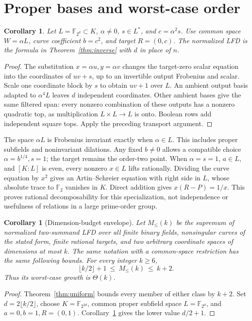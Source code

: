 \documentclass[11pt]{article}
\newtheorem{corollary}[theorem]{Corollary}
\theoremstyle{remark}\newtheorem{remark}[theorem]{Remark}
\newcommand{\F}{\mathbb F}
\begin{document}
\section{Proper bases and worst-case order}
\begin{corollary}\label{cor:scaled}
Let $L=\F_{2^d}\subset K$, $\alpha\ne0$, $s\in L^*$, and
$c=\alpha^2s$. Use common space $W=\alpha L$, curve coefficient $b=c^2$,
and target $R=(0,c)$. The normalized LFD is the formula in
Theorem~\ref{thm:inverse} with $d$ in place of $n$.
\end{corollary}
\begin{proof}
The substitution $x=\alpha u,y=\alpha v$ changes the target-zero scalar
equation into the coordinates of $uv+s$, up to an invertible output
Frobenius and scalar. Scale one coordinate block by $s$ to obtain $uv+1$
over $L$. An ambient output basis adapted to $\alpha^4L$ leaves $d$
independent coordinates. Other ambient bases give the same filtered span:
every nonzero combination of these outputs has a nonzero quadratic top,
as multiplication $L\times L\to L$ is onto. Boolean rows add independent
square tops. Apply the preceding transport argument.
\end{proof}

The space $\alpha L$ is Frobenius invariant exactly when $\alpha\in L$.
This includes proper subfields and noninvariant dilations. Any fixed
$b\ne0$ allows a compatible choice $\alpha=b^{1/4},s=1$; the target
remains the order-two point. When $\alpha=s=1$, $a\in L$, and $[K:L]$
is even, every nonzero $x\in L$ lifts rationally. Dividing the curve equation
by $x^2$ gives an Artin--Schreier equation with right side in $L$, whose
absolute trace to $\F_2$ vanishes in $K$. Direct addition gives
$x(R-P)=1/x$. This proves rational decomposability for this specialization,
not independence or usefulness of relations in a large prime-order group.

\begin{corollary}[Dimension-budget envelope]\label{cor:envelope}
Let $M_{\le}(k)$ be the supremum of normalized two-summand LFD over all
finite binary fields, nonsingular curves of the stated form, finite rational
targets, and two arbitrary coordinate spaces of dimensions at most $k$.
The same notation with a common-space restriction has the same following
bounds. For every integer $k\ge6$,
\[
             \lfloor k/2\rfloor+1\ \le\ M_{\le}(k)\ \le\ k+2.
\]
Thus its worst-case growth is $\Theta(k)$.
\end{corollary}
\begin{proof}
Theorem~\ref{thm:uniform} bounds every member of either class by $k+2$.
Set $d=2\lfloor k/2\rfloor$, choose $K=\F_{2^{2d}}$, common proper
subfield space $L=\F_{2^d}$, and $a=0,b=1,R=(0,1)$.
Corollary~\ref{cor:scaled} gives the lower value $d/2+1$.
\end{proof}
\end{document}
